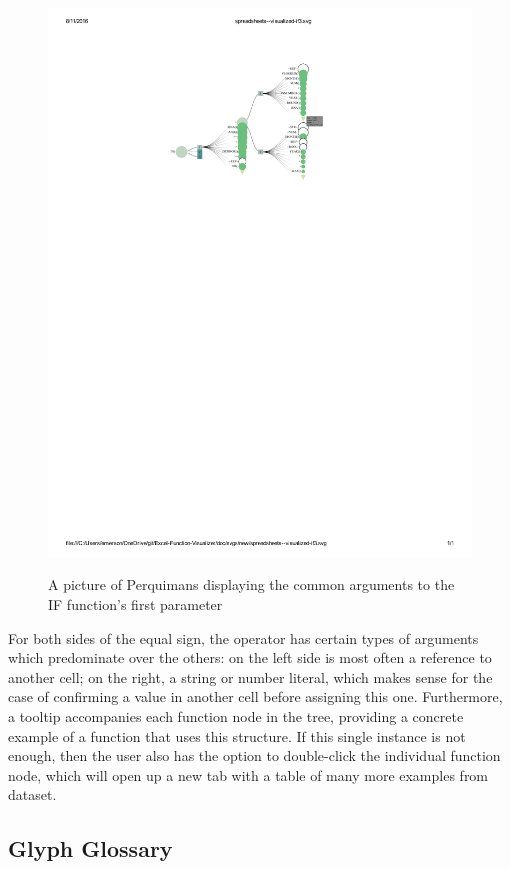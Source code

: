 \documentclass[conference]{IEEEtran}
\newcommand{\toolname}{Perquimans } \newcommand{\toolnameend}{Perquimans}
\begin{document}
	\begin{figure}[t] \centering \includegraphics[scale=.5]{IFargslabel}
		\caption{A picture of \toolname displaying the common arguments to the IF
			function's first parameter} \centering \label{fig:fullpic} \end{figure}
	
	For both sides of the equal sign, the operator has certain types of arguments
	which predominate over the others: on the left side is most often a reference
	to another cell; on the right, a string or number literal, which makes sense
	for the case of confirming a value in another cell before assigning this one.
	Furthermore, a tooltip accompanies each function node in the tree, providing a
	concrete example of a function that uses this structure. If this single
	instance is not enough, then the user also has the option to double-click the
	individual function node, which will open up a new tab with a table of many
	more examples from dataset.
	
	\subsection{Glyph Glossary}
	
\end{document}
